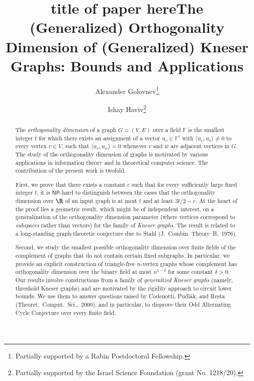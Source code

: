\documentclass{toc}
\newcommand{\Fset}{\mathbb{F}}
\newcommand{\NP}{\mathsf{NP}}
\begin{document}
\begin{frontmatter}%

%
%
%

%
\title{title of paper here}  %

%
%

\title{The (Generalized) Orthogonality Dimension of (Generalized) Kneser Graphs: Bounds and Applications}

%
%
%
%
%
%
%
%
%
%
%
%


%
%
%
%

%

\author[golovnev]{Alexander Golovnev\thanks{Partially supported by a Rabin Postdoctoral Fellowship.}}
\author[haviv]{Ishay Haviv\thanks{Partially supported by the Israel Science Foundation (grant No. 1218/20).}}

%
%
%
%

%
%
%
%
%
%
%
%
\begin{abstract}
  The \emph{orthogonality dimension} of a graph $G=(V,E)$ over a field $\Fset$ is the smallest integer $t$ for which there exists an assignment of a vector $u_v \in \Fset^t$ with $\langle u_v,u_v \rangle \neq 0$ to every vertex $v \in V$, such that
%
%
%
%
$\langle u_v, u_{w} \rangle = 0$ whenever $v$ and $w$  %
are adjacent vertices in $G$.
The study of the orthogonality dimension of graphs is motivated by various applications in information theory and in theoretical computer science.
The contribution of the present work is %
twofold.  %

First, we prove that there exists a constant $c$ such that for every sufficiently large
fixed  %
integer $t$, it is $\NP$-hard to 
%
%
distinguish between the cases that the orthogonality dimension over $\R$ of an input graph is at most $t$ and at least $3t/2-c$.
At the heart of the proof lies a geometric result, which might be of independent interest, on a generalization %
of the orthogonality dimension parameter
(where vertices correspond to \emph{subspaces} rather than vectors)
%
%
for the family of \emph{Kneser graphs}. The result is related to a long-standing graph-theoretic conjecture due to Stahl (J.~Combin. Theory--B,~1976).

Second, we study the smallest possible orthogonality dimension over finite fields of the complement of graphs that do not contain certain fixed subgraphs.
In particular, we provide an explicit construction of triangle-free $n$-vertex graphs whose complement has orthogonality dimension over the binary field at most $n^{1-\delta}$ for some constant $\delta >0$.
Our results involve constructions from
%
a family of  %
\emph{generalized Kneser graphs} %
%
%
%
(namely, threshold Kneser graphs)
and are motivated by the rigidity approach to circuit lower bounds.
We use them to answer
questions raised by Codenotti, Pudl{\'{a}}k, and Resta (Theoret.~Comput.~Sci.,~2000), and in particular, to disprove their Odd Alternating Cycle Conjecture over every finite field.
\end{abstract}


\end{frontmatter}
\end{document}
